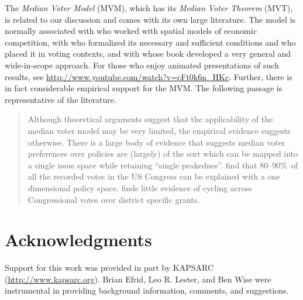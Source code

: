 The \emph{Median Voter Model} (MVM), which has its \emph{Median Voter Theorem} (MVT), is related to our discussion and comes with its own large literature. The model is normally associated with \cite{hotelling_1929} who worked with spatial models of economic competition, with \cite{black_duncan_1948} who formalized its necessary and sufficient conditions and who placed it in voting contexts, and with \cite{downs_1957} whose book developed a very general and wide-in-scope approach. For those who enjoy animated presentations of such results, see 
 \url{http://www.youtube.com/watch?v=cFt0k6n_HKc}. Further, there is in fact considerable empirical support for the MVM. The following passage is representative of the literature. 
 \begin{quote}
 Although theoretical arguments suggest that the applicability of the median voter model
may be very limited, the
empirical evidence suggests otherwise. There is a large body of evidence that suggests median voter preferences over policies are (largely) of the sort which can be
mapped into a single issue space while retaining ``single peakednes''. %
\cite{poole_daniels_1985} find that 80--90\%\ of all the recorded votes in the US Congress can be explained with a one dimensional policy space. %
\cite{stratmann_1996} finds little evidence of cycling across Congressional
votes over district specific grants. \cite{congleton_2004} 
\end{quote}

\section{Acknowledgments}

Support for this work was provided in part by KAPSARC (\url{http://www.kapsarc.org}). Brian Efrid, Leo R. Lester, and Ben Wise were instrumental in providing background information, comments, and suggestions. 
